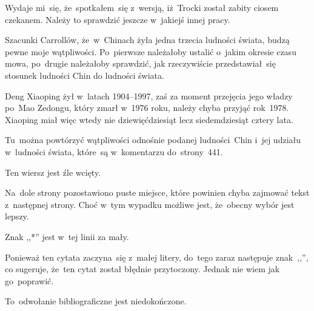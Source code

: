 \documentclass[a4paper,11pt]{article}
\begin{document}
\vspace{\spaceFour}


\start {} Wydaje mi~się, że~spotkałem~się z~wersją,
iż~Trocki został zabity ciosem czekanem. Należy to sprawdzić jeszcze
w~jakiejś innej pracy.

\vspace{\spaceFour}


\start {} Szacunki Carrollów, że~w~Chinach żyła jedna
trzecia ludności świata, budzą pewne moje wątpliwości. Po~pierwsze
należałoby ustalić o~jakim okresie czasu mowa, po~drugie należałoby
sprawdzić, jak rzeczywiście przedstawiał~się stosunek ludności Chin do
ludności świata.

\vspace{\spaceFour}


\start {} Deng Xiaoping żył w~latach 1904--1997, zaś za
moment przejęcia jego władzy po~Mao Zedongu, który zmarł w~1976 roku,
należy chyba przyjąć rok~1978. Xiaoping miał więc wtedy nie
dziewięćdziesiąt lecz siedemdziesiąt cztery lata.

\vspace{\spaceFour}


\start {} Tu~można powtórzyć wątpliwości odnośnie podanej
ludności~Chin i~jej udziału w~ludności świata, które~są w~komentarzu
do~strony~441.

\vspace{\spaceFour}


\start {} Ten wiersz jest źle wcięty.

\vspace{\spaceFour}


\start {} Na~dole strony pozostawiono puste miejsce, które
powinien chyba zajmować tekst z~następnej strony. Choć w~tym wypadku
możliwe jest, że~obecny wybór jest lepszy.

\vspace{\spaceFour}


\start {} Znak ,,*'' jest w~tej linii za mały.

\vspace{\spaceFour}


\start {} Ponieważ ten cytata zaczyna~się z~małej litery,
do~tego zaraz następuje znak~,,\ld'', co sugeruje, że~ten cytat został
błędnie przytoczony. Jednak nie wiem jak go~poprawić.

\vspace{\spaceFour}


\start {} To~odwołanie bibliograficzne jest niedokończone.
\end{document}
